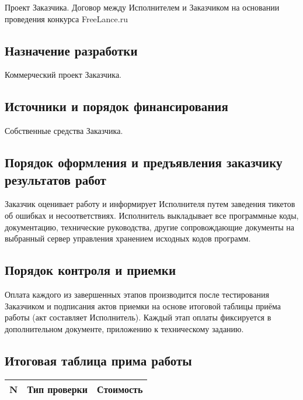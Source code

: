 Проект Заказчика. Договор между Исполнителем и Заказчиком на основании проведения конкурса
Free\-Lance.ru

\subsection{Назначение разработки}

Коммерческий проект Заказчика.

\subsection{Источники и порядок финансирования}

Собственные средства Заказчика.

\subsection{Порядок оформления и предъявления заказчику результатов работ}

Заказчик оценивает работу и информирует Исполнителя путем заведения тикетов об ошибках и
несоответствиях. Исполнитель выкладывает все программные коды, документацию, технические
руководства, другие сопровождающие документы на выбранный сервер управления хранением исходных кодов
программ.

\subsection{Порядок контроля и приемки}

Оплата каждого из завершенных этапов производится после тестирования Заказчиком и подписания актов
приемки на основе итоговой таблицы приёма работы (акт составляет Исполнитель). Каждый этап оплаты
фиксируется в дополнительном документе, приложению к техническому заданию.

\subsection{Итоговая таблица прима работы}

\begin{table}
\begin{center}
\noindent\begin{tabularx}{\linewidth}{|c|X|c|}

		\hline

		\textbf{N} & \textbf{Тип проверки} & \textbf{Стоимость} \\

		\hline

\end{tabularx}
\end{center}
\end{table}


